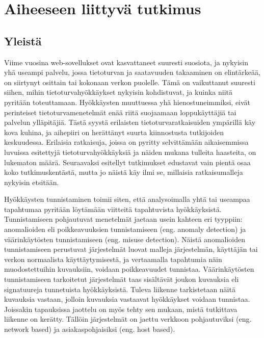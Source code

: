 
\chapter{Aiheeseen liittyvä tutkimus}

\section{Yleistä}

Viime vuosina web-sovellukset ovat kasvattaneet suuresti suosiota, ja nykyisin yhä useampi palvelu, jossa tietoturvan ja saatavuuden takaaminen on elintärkeää, on siirtynyt osittain tai kokonaan 
verkon puolelle. Tämä on vaikuttanut suuresti siihen, mihin tietoturvahyökkäykset nykyisin kohdistuvat, ja kuinka niitä pyritään toteuttamaan. Hyökkäysten muuttuessa yhä hienostuneimmiksi, 
eivät perinteiset tietoturvamenetelmät enää riitä suojaamaan loppukäyttäjiä tai palvelun ylläpitäjiä. Tästä syystä erilaisten tietoturvaratkaisuiden ympärillä käy kova kuhina, ja aihepiiri 
on herättänyt suurta kiinnostusta tutkijoiden keskuudessa. Erilaisia ratkaisuja, joissa on pyritty selvittämään aikaisemmissa luvuissa esitettyjä tietoturvahyökkäyksiä ja näiden 
mukana tulleita haasteita, on lukematon määrä. Seuraavaksi esitellyt tutkimukset edustavat vain pientä osaa koko tutkimuskentästä, mutta jo näistä käy ilmi se, millaisia ratkaisumalleja
nykyisin etsitään.

Hyökkäysten tunnistaminen toimii siten, että analysoimalla yhtä tai useampaa tapahtumaa pyritään löytämään viitteitä tapahtuvista hyökkäyksistä. Tunnistamiseen pohjautuvat menetelmät jaetaan usein
kahteen eri tyyppiin: anomalioiden eli poikkeavuuksien tunnistamiseen (eng. anomaly detection) ja väärinkäytösten tunnistamiseen (eng. misuse detection). Näistä anomalioiden tunnistamiseen perustuvat
järjestelmät luovat malleja järjestelmän, käyttäjän tai verkon normaalista käyttäytymisestä, ja vertaamalla tapahtumia näin muodostettuihin kuvauksiin, voidaan poikkeavuudet tunnistaa. Väärinkäytösten 
tunnistamiseen tarkoitetut järjestelmät taas sisältävät joukon kuvauksia eli signatuureja tunnetuista hyökkäyksistä. Tuleva liikenne tarkistetaan näitä kuvauksia vastaan, jolloin kuvauksia vastaavat
hyökkäykset voidaan tunnistaa. Joissakin tapauksissa jaottelu on myös tehty sen mukaan, mistä tutkittava liikenne on kerätty. Tällöin järjestelmät on jaettu verkkoon pohjautuviksi (eng. network based)
ja asiakaspohjaisiksi (eng. host based). 

